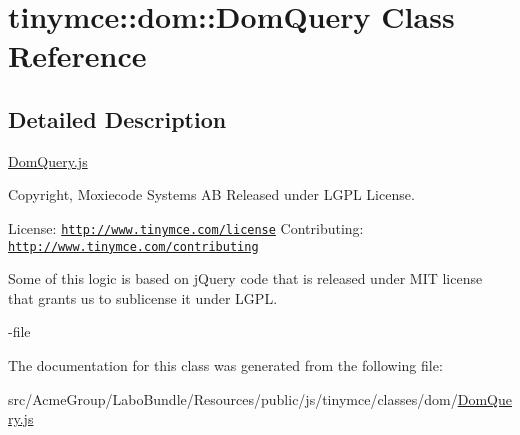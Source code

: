 \hypertarget{classtinymce_1_1dom_1_1_dom_query}{\section{tinymce\+:\+:dom\+:\+:Dom\+Query Class Reference}
\label{classtinymce_1_1dom_1_1_dom_query}
}


\subsection{Detailed Description}
\hyperlink{_dom_query_8js}{Dom\+Query.\+js}

Copyright, Moxiecode Systems A\+B Released under L\+G\+P\+L License.

License\+: \href{http://www.tinymce.com/license}{\tt http\+://www.\+tinymce.\+com/license} Contributing\+: \href{http://www.tinymce.com/contributing}{\tt http\+://www.\+tinymce.\+com/contributing}

Some of this logic is based on j\+Query code that is released under M\+I\+T license that grants us to sublicense it under L\+G\+P\+L.

-\/file 

The documentation for this class was generated from the following file\+:\begin{DoxyCompactItemize}
\item 
src/\+Acme\+Group/\+Labo\+Bundle/\+Resources/public/js/tinymce/classes/dom/\hyperlink{_dom_query_8js}{Dom\+Query.\+js}\end{DoxyCompactItemize}
